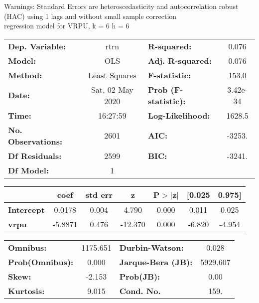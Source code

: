 Warnings: \newline
 [1] Standard Errors are heteroscedasticity and autocorrelation robust (HAC) using 1 lags and without small sample correction\\ 

regression model for VRPU, k = 6 h = 6\begin{center}
\begin{tabular}{lclc}
\toprule
\textbf{Dep. Variable:}    &       rtrn       & \textbf{  R-squared:         } &     0.076   \\
\textbf{Model:}            &       OLS        & \textbf{  Adj. R-squared:    } &     0.076   \\
\textbf{Method:}           &  Least Squares   & \textbf{  F-statistic:       } &     153.0   \\
\textbf{Date:}             & Sat, 02 May 2020 & \textbf{  Prob (F-statistic):} &  3.42e-34   \\
\textbf{Time:}             &     16:27:59     & \textbf{  Log-Likelihood:    } &    1628.5   \\
\textbf{No. Observations:} &        2601      & \textbf{  AIC:               } &    -3253.   \\
\textbf{Df Residuals:}     &        2599      & \textbf{  BIC:               } &    -3241.   \\
\textbf{Df Model:}         &           1      & \textbf{                     } &             \\
\bottomrule
\end{tabular}
\begin{tabular}{lcccccc}
                   & \textbf{coef} & \textbf{std err} & \textbf{z} & \textbf{P$> |$z$|$} & \textbf{[0.025} & \textbf{0.975]}  \\
\midrule
\textbf{Intercept} &       0.0178  &        0.004     &     4.790  &         0.000        &        0.011    &        0.025     \\
\textbf{vrpu}      &      -5.8871  &        0.476     &   -12.370  &         0.000        &       -6.820    &       -4.954     \\
\bottomrule
\end{tabular}
\begin{tabular}{lclc}
\textbf{Omnibus:}       & 1175.651 & \textbf{  Durbin-Watson:     } &    0.028  \\
\textbf{Prob(Omnibus):} &   0.000  & \textbf{  Jarque-Bera (JB):  } & 5929.607  \\
\textbf{Skew:}          &  -2.153  & \textbf{  Prob(JB):          } &     0.00  \\
\textbf{Kurtosis:}      &   9.015  & \textbf{  Cond. No.          } &     159.  \\
\bottomrule
\end{tabular}
\end{center}

